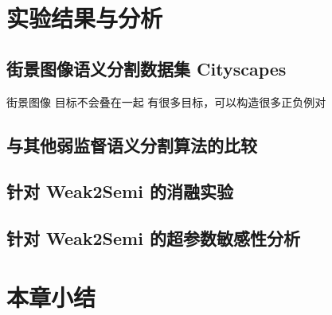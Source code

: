 \section{实验结果与分析}
\subsection{街景图像语义分割数据集 Cityscapes}
街景图像
目标不会叠在一起
有很多目标，可以构造很多正负例对
\subsection{与其他弱监督语义分割算法的比较}




\subsection{针对 Weak2Semi 的消融实验}
\subsection{针对 Weak2Semi 的超参数敏感性分析}
\section{本章小结}
